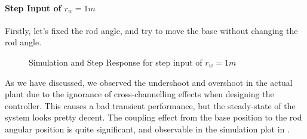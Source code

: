 \documentclass{tron}
\begin{document}
\paragraph{Step Input of $r_{w}=1\unit{m}$}
Firstly, let's fixed the rod angle, and try to move the base without changing the rod angle.
\begin{figure}[H]
	\centering
	 \quad
	\caption{Simulation and Step Response for step input of $r_{w}=1\unit{m}$}
	\label{fig:p5:P3_aug:sim:fixe-theta}
\end{figure}

As we have discussed, we observed the undershoot and overshoot in the actual plant due to the ignorance of cross-channelling effects when designing the controller. This causes a bad transient performance, but the steady-state of the system looks pretty decent. The coupling effect from the base position to the rod angular position is quite significant, and observable in the simulation plot in .
\end{document}

